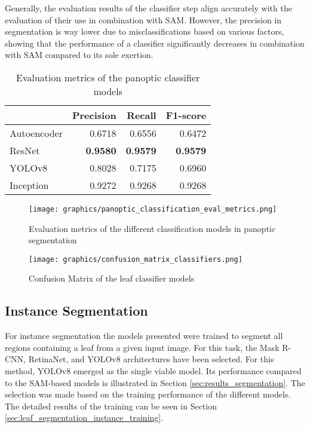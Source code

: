 \documentclass[draft,final]{vutinfth} %
\begin{document}
Generally, the evaluation results of the classifier step align accurately with the evaluation of their use in combination with SAM. However, the precision in segmentation is way lower due to misclassifications based on various factors, showing that the performance of a classifier significantly decreases in combination with SAM compared to its sole exertion.

\begin{table}[]
    \centering
    \begin{tabular}{lrrr}
    \toprule
    & Precision & Recall & F1-score \\
    \midrule
    Autoencoder & 0.6718 & 0.6556 & 0.6472 \\
    ResNet & \textbf{0.9580} & \textbf{0.9579} & \textbf{0.9579} \\
    YOLOv8 & 0.8028 & 0.7175 & 0.6960 \\
    Inception & 0.9272 & 0.9268 & 0.9268 \\
    \bottomrule
    \end{tabular}
    \caption{Evaluation metrics of the panoptic classifier models}
    \label{tab:panoptic_classification_metrics}
\end{table}

\begin{figure}
    \centering
    \texttt{[image: graphics/panoptic\_classification\_eval\_metrics.png]}
    \caption{Evaluation metrics of the different classification models in panoptic segmentation}
    \label{fig:panoptic_classification_eval_metrics}
\end{figure}

\begin{figure}
    \centering
    \texttt{[image: graphics/confusion\_matrix\_classifiers.png]}
    \caption{Confusion Matrix of the leaf classifier models}
    \label{fig:panoptic_classification_conf_matrix}
\end{figure}

\subsection{Instance Segmentation} \label{sec:results_segmentation_instance}
For instance segmentation the models presented were trained to segment all regions containing a leaf from a given input image. For this task, the Mask R-CNN, RetinaNet, and YOLOv8 architectures have been selected.
For this method, YOLOv8 emerged as the single viable model. Its performance compared to the SAM-based models is illustrated in Section \ref{sec:results_segmentation}.
The selection was made based on the training performance of the different models. The detailed results of the training can be seen in Section \ref{sec:leaf_segmentation_instance_training}. 
\end{document}
